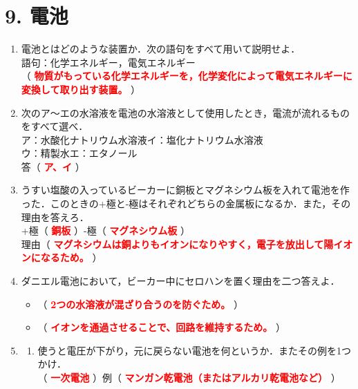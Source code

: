 \section*{9. 電池}
\begin{enumerate}
    \item 電池とはどのような装置か．次の語句をすべて用いて説明せよ．\\
    語句：化学エネルギー，電気エネルギー\\
    （ \textcolor{red}{\textbf{物質がもっている化学エネルギーを，化学変化によって電気エネルギーに変換して取り出す装置。}} ）
    \item 次のア～エの水溶液を電池の水溶液として使用したとき，電流が流れるものをすべて選べ．\\
    ア：水酸化ナトリウム水溶液\hspace{1cm}イ：塩化ナトリウム水溶液\hspace{1cm}\\
    ウ：精製水\hspace{1cm}エ：エタノール\\[0.2cm]
    答（ \textcolor{red}{\textbf{ア、イ}} ）
    \item うすい塩酸の入っているビーカーに銅板とマグネシウム板を入れて電池を作った．このときの+極と-極はそれぞれどちらの金属板になるか．また，その理由を答えろ．\\
    +極（ \textcolor{red}{\textbf{銅板}} ）\hspace{1cm}-極（ \textcolor{red}{\textbf{マグネシウム板}} ）\\
    理由（ \textcolor{red}{\textbf{マグネシウムは銅よりもイオンになりやすく，電子を放出して陽イオンになるため。}} ）
    \item ダニエル電池において，ビーカー中にセロハンを置く理由を二つ答えよ．
    \begin{itemize}
        \item[1] （ \textcolor{red}{\textbf{2つの水溶液が混ざり合うのを防ぐため。}} ）\vspace{0.5em}
        \item[2] （ \textcolor{red}{\textbf{イオンを通過させることで、回路を維持するため。}} ）
    \end{itemize}
    \item \begin{enumerate}
        \item 使うと電圧が下がり，元に戻らない電池を何というか．またその例を1つかけ．\\
        （ \textcolor{red}{\textbf{一次電池}} ）\hspace{1cm}例（ \textcolor{red}{\textbf{マンガン乾電池（またはアルカリ乾電池など）}} ）

\end{enumerate}
\end{enumerate}
